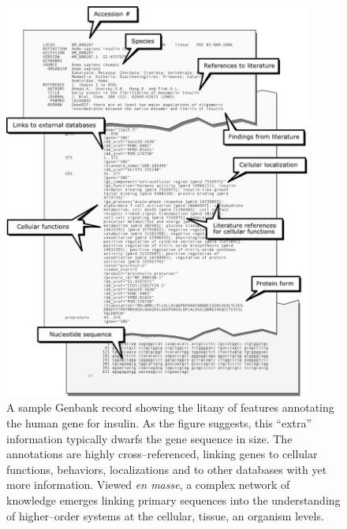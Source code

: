             \begin{figure}[ptb]
            \centering
            \includegraphics[width=0.90\textwidth]{Body/Images-chap1/genbank-record.pdf}
            \caption[A sample Genbank record]{A sample Genbank
            record showing the litany of features annotating the
            human gene for insulin.  As the figure suggests, this
            ``extra'' information typically dwarfs the gene sequence
            in size.  The annotations are highly cross--referenced,
            linking genes to cellular functions, behaviors,
            localizations and to other databases with yet more
            information.  Viewed \emph{en masse}, a complex network
            of knowledge emerges linking primary sequences
            into the understanding of higher--order systems at the
            cellular, tissue, an organism levels.
        }
            \label{fig:genbank-record}
            \end{figure}







